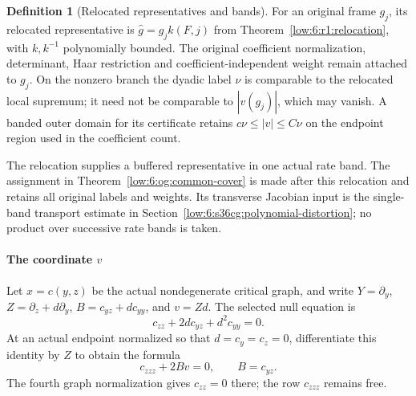 \documentclass[11pt]{amsart}
\theoremstyle{definition}
\newtheorem{definition}{Definition}[section]
\theoremstyle{remark}
\numberwithin{equation}{section}
\begin{document}
\begin{definition}[Relocated representatives and bands]\label{def:relocated-band}
For an original frame $g_j$, its relocated representative is $\widehat g=g_jk(F,j)$ from Theorem~\ref{low:6:r1:relocation}, with $k,k^{-1}$ polynomially bounded. The original coefficient normalization, determinant, Haar restriction and coefficient-independent weight remain attached to $g_j$. On the nonzero branch the dyadic label $\nu$ is comparable to the relocated local supremum; it need not be comparable to $|v(g_j)|$, which may vanish. A banded outer domain for its certificate retains $c\nu\le|v|\le C\nu$ on the endpoint region used in the coefficient count.
\end{definition}
The relocation supplies a buffered representative in one actual rate band. The assignment in Theorem~\ref{low:6:og:common-cover} is made after this relocation and retains all original labels and weights. Its transverse Jacobian input is the single-band transport estimate in Section~\ref{low:6:s36cg:polynomial-distortion}; no product over successive rate bands is taken.

\paragraph{The coordinate \texorpdfstring{$v$}{v}}

Let $x=c(y,z)$ be the actual nondegenerate critical graph, and write $Y=\partial_y$, $Z=\partial_z+d\partial_y$, $B=c_{yz}+dc_{yy}$, and $v=Zd$. The selected null equation is
\[
c_{zz}+2dc_{yz}+d^2c_{yy}=0.
\]
At an actual endpoint normalized so that $d=c_y=c_z=0$, differentiate this identity by $Z$ to obtain the formula
\begin{equation}\label{low:6:r3:v-graph-row}
c_{zzz}+2Bv=0,\qquad B=c_{yz}.
\end{equation}
The fourth graph normalization gives $c_{zz}=0$ there; the row $c_{zzz}$ remains free.
\end{document}
